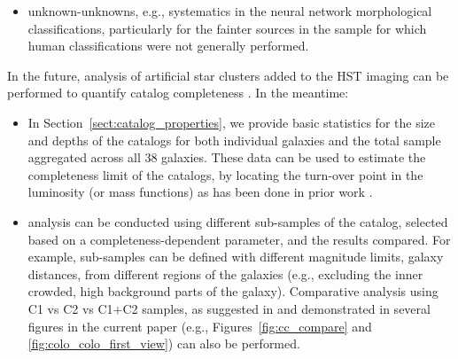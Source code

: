 \documentclass[]{aastex631}
\begin{document}
\begin{itemize}
\begin{itemize}
    \item Even when pipelines are specifically developed for single-peaked clusters, differences in the adopted detection algorithm and morphological selection criteria \citep[which has generally been based on some form of concentration index, e.g.,][]{chandar_luminosity_2010, adamo_legacy_2017} can lead to significant differences in the populations captured.  As discussed in \citet{thilker_phangs-hst_2022}, LEGUS \citep{calzetti_legacy_2015} has produced cluster catalogs for four of the seven galaxies in common with PHANGS (NGC~628, NGC~1433, NGC~1566, NGC~3351)\footnote{\url{https://archive.stsci.edu/prepds/legus/dataproducts-public.html}}, and there is an overlap of 50-75\% of human verified C1 and C2 clusters in the union of the LEGUS$+$PHANGS-HST catalogs.  Understanding the differences in the catalogs, and comparison of results based on the union of the two catalogs with those based on the separate catalogs from each survey will be important subjects for future investigation.
    \end{itemize}
    \item unknown-unknowns, e.g., systematics in the neural network morphological classifications, particularly for the fainter sources in the sample for which human classifications were not generally performed. 
    
\end{itemize}

In the future, analysis of artificial star clusters added to the HST imaging can be performed to quantify catalog completeness \citep[e.g.,][]{adamo_legacy_2017, tang_cluster_2023}.  In the meantime:
\begin{itemize}
\item In Section~\ref{sect:catalog_properties}, we provide basic statistics for the size and depths of the catalogs for both individual galaxies and the total sample aggregated across all 38 galaxies.  These data can be used to estimate the completeness limit of the catalogs, by locating the turn-over point in the luminosity (or mass functions) as has been done in prior work \citep[e.g.,][]{mayya_hst_2008, ryon_effective_2017, cook_star_2019, cuevas-otahola_cluster_2023}.
\item analysis can be conducted using different sub-samples of the catalog, selected based on a completeness-dependent parameter, and the results compared.  For example, sub-samples can be defined with different magnitude limits, galaxy distances, from different regions of the galaxies (e.g., excluding the inner crowded, high background parts of the galaxy).  Comparative analysis using C1 vs C2 vs C1+C2 samples, as suggested in \citet{whitmore_star_2021} and demonstrated in several figures in the current paper (e.g., Figures~\ref{fig:cc_compare} and \ref{fig:colo_colo_first_view}) can also be performed.
\end{itemize}
\end{document}
